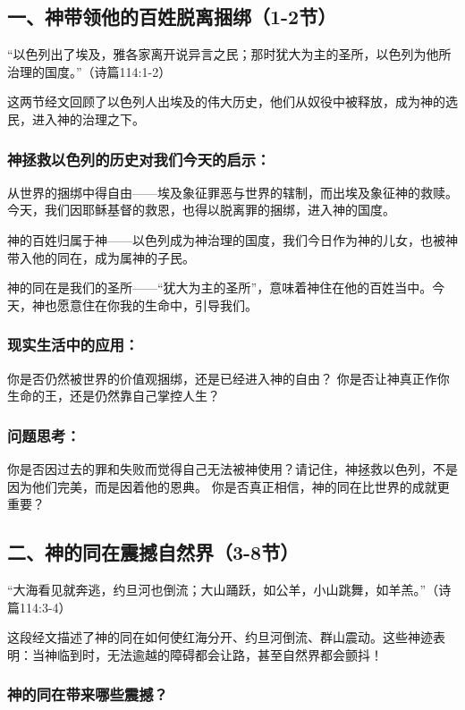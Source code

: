 \documentclass[a4paper, 12pt]{article}
\begin{document}
\subsection*{一、神带领他的百姓脱离捆绑（1-2节）}
“以色列出了埃及，雅各家离开说异言之民；那时犹大为主的圣所，以色列为他所治理的国度。”（诗篇114:1-2）

这两节经文回顾了以色列人出埃及的伟大历史，他们从奴役中被释放，成为神的选民，进入神的治理之下。

\subsubsection*{神拯救以色列的历史对我们今天的启示：}

\hspace{0.6cm}从世界的捆绑中得自由——埃及象征罪恶与世界的辖制，而出埃及象征神的救赎。今天，我们因耶稣基督的救恩，也得以脱离罪的捆绑，进入神的国度。

神的百姓归属于神——以色列成为神治理的国度，我们今日作为神的儿女，也被神带入他的同在，成为属神的子民。

神的同在是我们的圣所——“犹大为主的圣所”，意味着神住在他的百姓当中。今天，神也愿意住在你我的生命中，引导我们。

\subsubsection*{现实生活中的应用：}

你是否仍然被世界的价值观捆绑，还是已经进入神的自由？
你是否让神真正作你生命的王，还是仍然靠自己掌控人生？
\subsubsection*{问题思考：}

你是否因过去的罪和失败而觉得自己无法被神使用？请记住，神拯救以色列，不是因为他们完美，而是因着他的恩典。
你是否真正相信，神的同在比世界的成就更重要？
\subsection*{二、神的同在震撼自然界（3-8节）}
“大海看见就奔逃，约旦河也倒流；大山踊跃，如公羊，小山跳舞，如羊羔。”（诗篇114:3-4）

这段经文描述了神的同在如何使红海分开、约旦河倒流、群山震动。这些神迹表明：当神临到时，无法逾越的障碍都会让路，甚至自然界都会颤抖！

\subsubsection*{神的同在带来哪些震撼？}
\end{document}
